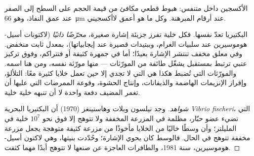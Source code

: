 \begin{omfigure}

{\small الأكسجين داخل  متنفس: هبوط قطعي مكافئ من قيمة
الحجم على السطح إلى الصفر عند عمق النفاذ، وهو \qty{66}{\micro m}
عند أرقام المبرهنة. وكل ما هو أعمق لاأكسجيني.}
\end{omfigure}

\begin{proposition}\label{prop:b2:microbial-metabolism:quorum}
البكتيريا تعدّ نفسها. فكل خلية تفرز جزيئة إشارة صغيرة،
\emph{محرّضًا ذاتيًا} (لاكتونات أسيل-هوموسيرين عند سلبيات الغرام،
وببتيدات قصيرة عند إيجابياتها)، بمعدل ثابت منخفض. وفي معلق مخفف
تنتشر الإشارة بعيدًا؛ أما في جمهرة كثيفة أو  فتتراكم، وفوق
تركيز عتبي ترتبط بمستقبل يشغّل طائفة من المورّثات --- منها مورّثة
 نفسه، ومن هنا اسمه. والمورّثات التي تُضبط هكذا هي
التي لا تجدي إلا حين تعمل خلايا كثيرة معًا: التلألؤ، وإفراز
الإنزيمات الهاضمة والذيفانات، وإنتاج الحشوة، وفوعة الممرضات التي
عليها أن تغمر المضيف دفعة واحدة لا أن تنبهه خلية خلية.
\end{proposition}
\begin{proof}[شواهد]
وجد نيلسون وبلات وهاستينغز (1970) أن البكتيريا البحرية
\emph{Vibrio fischeri}، التي تضيء عضو حبّار، مظلمة في المزرعة
المخففة ولا تتوهج إلا فوق نحو $10^{7}$ خلية في المليلتر؛ وأن وسطًا
خاليًا من الخلايا مأخوذًا من مزرعة كثيفة متوهجة يجعل مزرعة مخففة
تتوهج في الحال. فالوسط كان يحوي الإشارة؛ وحُدّدت بنيتها، وهي لاكتون
أسيل-هوموسيرين، سنة 1981، والطافرات العاجزة عن صنعها لا تتوهج أبدًا
مهما كثفت.
\end{proof}

